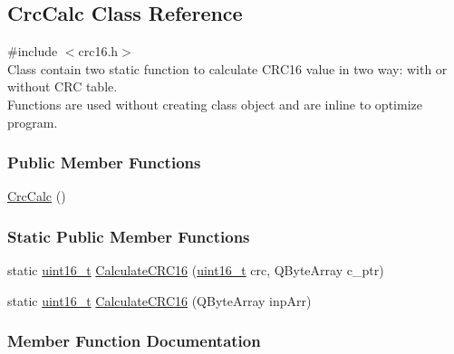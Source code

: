 \hypertarget{classCrcCalc}{}\subsection{Crc\+Calc Class Reference}
\label{classCrcCalc}
{\ttfamily \#include $<$crc16.\+h$>$}\\
Class contain two static function to calculate CRC16 value in two way: with or without CRC table.\\
Functions are used without creating class object and are inline to optimize program.

\subsubsection*{Public Member Functions}
\begin{DoxyCompactItemize}
\item 
\mbox{\hyperlink{classCrcCalc_a9e3d8fbe834f69aeb8a21a16e26bfa1f}{Crc\+Calc}} ()
\end{DoxyCompactItemize}
\subsubsection*{Static Public Member Functions}
\begin{DoxyCompactItemize}
\item 
static \mbox{\hyperlink{settings_8h_a017dd44e68049ffdd31500a8cd01ba68}{uint16\+\_\+t}} \mbox{\hyperlink{classCrcCalc_af903157f70d448ef1dd660f8580ba0c6}{Calculate\+C\+R\+C16}} (\mbox{\hyperlink{settings_8h_a017dd44e68049ffdd31500a8cd01ba68}{uint16\+\_\+t}} crc, Q\+Byte\+Array c\+\_\+ptr)
\item 
static \mbox{\hyperlink{settings_8h_a017dd44e68049ffdd31500a8cd01ba68}{uint16\+\_\+t}} \mbox{\hyperlink{classCrcCalc_aa4d7542b130a13fb3d675b885cfadbbd}{Calculate\+C\+R\+C16}} (Q\+Byte\+Array inp\+Arr)
\end{DoxyCompactItemize}

\subsubsection{Member Function Documentation}
\mbox{\label{classCrcCalc_af903157f70d448ef1dd660f8580ba0c6}} 
